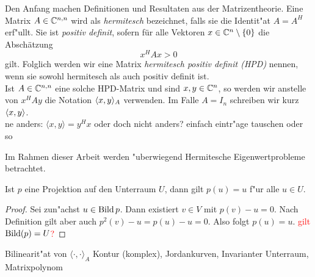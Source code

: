 Den Anfang machen Definitionen und Resultaten aus der Matrizentheorie.
Eine Matrix $A\in\Cnn$ wird als \emph{hermitesch} bezeichnet, falls
sie die Identit"at $A=A^H$ erf"ullt. Sie ist \emph{positiv definit}, sofern
für alle Vektoren $x\in\Co$ die Abschätzung
\[
x^H A x > 0
\]
gilt. Folglich werden wir eine Matrix \emph{hermitesch positiv definit (HPD)}
nennen, wenn sie sowohl hermitesch als auch positiv definit ist.\\

Ist $A\in\Cnn$ eine solche HPD-Matrix und sind $x,y\in\Cn$, so werden wir anstelle von
$x^H A y$ die Notation $\sp{A}{x,y}$ verwenden. Im Falle $A=I_n$ schreiben wir
kurz $\sp{}{x,y}$.\\

ne anders: $\langle x,y \rangle = y^H x$ oder doch nicht anders? einfach eintr"age tauschen oder so

Im Rahmen dieser Arbeit werden "uberwiegend Hermitesche Eigenwertprobleme betrachtet.

\begin{prop}
Ist $p$ eine Projektion auf den Unterraum $U$, dann gilt $p(u) = u$ f"ur
alle $u \in U$.
\end{prop}
\begin{proof}
Sei zun"achst $u \in \Bild{p}$. Dann existiert $v \in V$ mit $p(v) - u = 0$.
Nach Definition gilt aber auch $p^2(v)-u = p(u)-u = 0$. Also folgt $p(u)=u$.
\textcolor{red}{gilt $\Bild(p) = U$?}
\end{proof}

Bilinearit"at von $\langle \cdot, \cdot \rangle_A$
Kontur (komplex), Jordankurven, Invarianter Unterraum, Matrixpolynom
